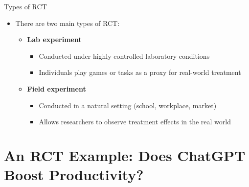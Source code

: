 \documentclass[hyperref={pdfpagelabels=false}]{beamer}
\begin{document}
	\begin{frame}{Types of RCT}
		\begin{itemize}
			\item There are two main types of RCT:
			\vspace{0.2cm}
			\begin{itemize}
				\item[1] \textbf{Lab experiment}
				\vspace{0.2cm}
				\begin{itemize}
					\item Conducted under highly controlled laboratory conditions
					\vspace{0.1cm}
					\item Individuals play games or tasks as a proxy for real-world treatment
				\end{itemize}
				\vspace{0.3cm}
				\item[2] \textbf{Field experiment}
				\vspace{0.2cm}
				\begin{itemize}
					\item Conducted in a natural setting (school, workplace, market)
					\vspace{0.1cm}
					\item Allows researchers to observe treatment effects in the real world
				\end{itemize}
			\end{itemize}
		\end{itemize}
	\end{frame}
	
	\section{An RCT Example: Does ChatGPT Boost Productivity?}
	
\end{document}
